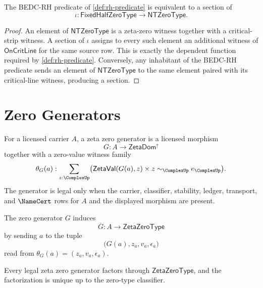 \begin{theorem}
\label{thm:rh-zeta-zero-type-rh-fixed-half-coverage}
The BEDC-RH predicate of \autoref{def:rh-predicate} is equivalent to a
section of
$$
\iota:\mathsf{FixedHalfZeroType}\to\mathsf{NTZeroType}.
$$
\end{theorem}

\begin{proof}
An element of $\mathsf{NTZeroType}$ is a zeta-zero witness together with a
critical-strip witness. A section of $\iota$ assigns to every such element
an additional witness of $\mathsf{OnCritLine}$ for the same source row.
This is exactly the dependent function required by
\autoref{def:rh-predicate}. Conversely, any inhabitant of the BEDC-RH
predicate sends an element of $\mathsf{NTZeroType}$ to the same element
paired with its critical-line witness, producing a section.
\end{proof}

\section{Zero Generators}
\label{sec:rh-zeta-zero-generators}

\begin{definition}
\label{def:rh-zeta-zero-generator}
For a licensed carrier $A$, a zeta zero generator is a licensed morphism
$$
G:A\to\mathsf{ZetaDom}^{\uparrow}
$$
together with a zero-value witness family
$$
\theta_G(a):
\sum_{z:\ComplexUp}
\bigl(
\mathsf{ZetaVal}(G(a),z)
\times
z\sim_{\ComplexUp}e_{\ComplexUp}
\bigr).
$$
The generator is legal only when the carrier, classifier, stability,
ledger, transport, and $\NameCert$ rows for $A$ and the displayed morphism
are present.
\end{definition}

\begin{definition}
\label{def:rh-zeta-zero-induced-map}
The zero generator $G$ induces
$$
\overline G:A\to\mathsf{ZetaZeroType}
$$
by sending $a$ to the tuple
$$
\bigl(G(a),z_a,v_a,\epsilon_a\bigr)
$$
read from $\theta_G(a)=(z_a,v_a,\epsilon_a)$.
\end{definition}

\begin{theorem}
\label{thm:rh-zeta-zero-generator-factorization}
Every legal zeta zero generator factors through
$\mathsf{ZetaZeroType}$, and the factorization is unique up to the
zero-type classifier.
\end{theorem}

